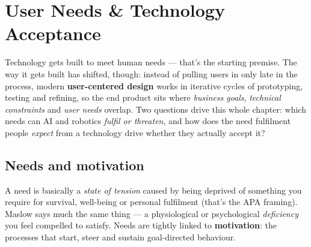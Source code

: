 \documentclass[11pt, oneside]{book}
\begin{document}


\chapter{User Needs \& Technology Acceptance}

Technology gets built to meet human needs — that's the starting premise.
The way it gets built has shifted, though: instead of pulling users in only
late in the process, modern \textbf{user-centered design} works in iterative
cycles of prototyping, testing and refining, so the end product sits where
\emph{business goals}, \emph{technical constraints} and \emph{user needs}
overlap. Two questions drive this whole chapter: which needs can AI and
robotics \emph{fulfil or threaten}, and how does the need fulfilment people
\emph{expect} from a technology drive whether they actually accept it?

\section{Needs and motivation}

\begin{defbox}[title={Need}]
A need is basically a \emph{state of tension} caused by being deprived of
something you require for survival, well-being or personal fulfilment
(that's the APA framing). Maslow says much the same thing — a physiological
or psychological \emph{deficiency} you feel compelled to satisfy. Needs are
tightly linked to \textbf{motivation}: the processes that start, steer and
sustain goal-directed behaviour.
\end{defbox}
\end{document}
